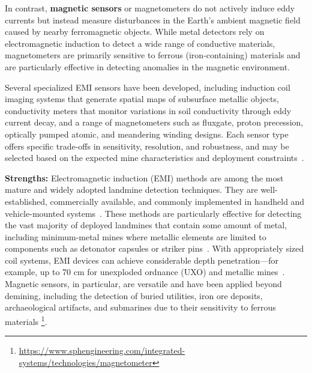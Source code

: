 In contrast, \textbf{magnetic sensors} or magnetometers do not actively induce eddy currents but instead measure disturbances in the Earth's ambient magnetic field caused by nearby ferromagnetic objects. While metal detectors rely on electromagnetic induction to detect a wide range of conductive materials, magnetometers are primarily sensitive to ferrous (iron-containing) materials and are particularly effective in detecting anomalies in the magnetic environment.

Several specialized EMI sensors have been developed, including induction coil imaging systems that generate spatial maps of subsurface metallic objects, conductivity meters that monitor variations in soil conductivity through eddy current decay, and a range of magnetometers such as fluxgate, proton precession, optically pumped atomic, and meandering winding designs. Each sensor type offers specific trade-offs in sensitivity, resolution, and robustness, and may be selected based on the expected mine characteristics and deployment constraints~\cite{Gooneratne2004ARO, Bruschini1997ASO}.

\textbf{Strengths:} Electromagnetic induction (EMI) methods are among the most mature and widely adopted landmine detection techniques. They are well-established, commercially available, and commonly implemented in handheld and vehicle-mounted systems~\cite{gichd2006guidebook}. These methods are particularly effective for detecting the vast majority of deployed landmines that contain some amount of metal, including minimum-metal mines where metallic elements are limited to components such as detonator capsules or striker pins~\cite{gichd2006guidebook}. With appropriately sized coil systems, EMI devices can achieve considerable depth penetration—for example, up to 70 cm for unexploded ordnance (UXO) and metallic mines~\cite{gichd2006guidebook}. Magnetic sensors, in particular, are versatile and have been applied beyond demining, including the detection of buried utilities, iron ore deposits, archaeological artifacts, and submarines due to their sensitivity to ferrous materials \footnote{\url{https://www.sphengineering.com/integrated-systems/technologies/magnetometer}}.

